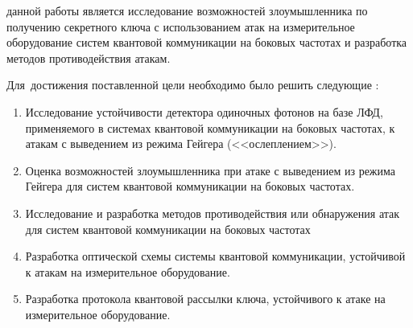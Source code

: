 
{\aim} данной работы является исследование возможностей злоумышленника по получению секретного ключа с использованием атак на измерительное оборудование систем квантовой коммуникации на боковых частотах и разработка методов противодействия атакам.


Для~достижения поставленной цели необходимо было решить следующие {\tasks}:
\begin{enumerate}
  \item Исследование устойчивости детектора одиночных фотонов на базе ЛФД, применяемого в системах квантовой коммуникации на боковых частотах, к атакам с выведением из режима Гейгера (<<ослеплением>>). 

  \item Оценка возможностей злоумышленника при атаке с выведением из режима Гейгера для систем квантовой коммуникации на боковых частотах. 
  \item Исследование и разработка методов противодействия или обнаружения атак для систем квантовой коммуникации на боковых частотах

  \item Разработка оптической схемы системы квантовой коммуникации, устойчивой к атакам на измерительное оборудование. 

  \item Разработка протокола квантовой рассылки ключа, устойчивого к атаке на измерительное оборудование. 

\end{enumerate}


